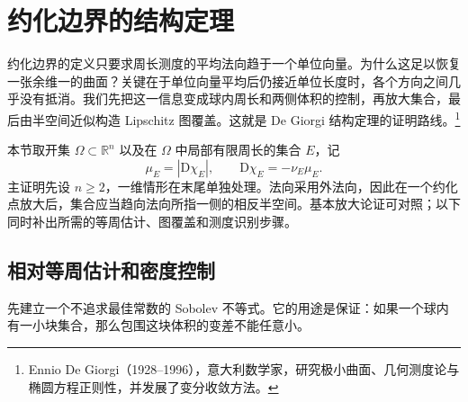 
% 
% 

\section{约化边界的结构定理}
\label{g3:sec:2104}

约化边界的定义只要求周长测度的平均法向趋于一个单位向量。为什么这足以恢复一张余维一的曲面？关键在于单位向量平均后仍接近单位长度时，各个方向之间几乎没有抵消。我们先把这一信息变成球内周长和两侧体积的控制，再放大集合，最后由半空间近似构造 Lipschitz 图覆盖。这就是 De Giorgi 结构定理的证明路线。\footnote{Ennio De Giorgi（1928--1996），意大利数学家，研究极小曲面、几何测度论与椭圆方程正则性，并发展了变分收敛方法。}

\ProseParagraphBreak
本节取开集 \(\Omega\subset\mathbb R^n\) 以及在 \(\Omega\) 中局部有限周长的集合 \(E\)，记
\[
	\mu_E=|\mathrm D\chi_E|,\qquad
	\mathrm D\chi_E=-\nu_E\mu_E.
\]
主证明先设 \(n\ge2\)，一维情形在末尾单独处理。法向采用外法向，因此在一个约化点放大后，集合应当趋向法向所指一侧的相反半空间。基本放大论证可对照\cite[第14节，定理14.3，第72--76页]{Simon1983}；以下同时补出所需的等周估计、图覆盖和测度识别步骤。

\subsection{相对等周估计和密度控制}
\label{g3:subsec:2104:01}
先建立一个不追求最佳常数的 Sobolev 不等式。它的用途是保证：如果一个球内有一小块集合，那么包围这块体积的变差不能任意小。

